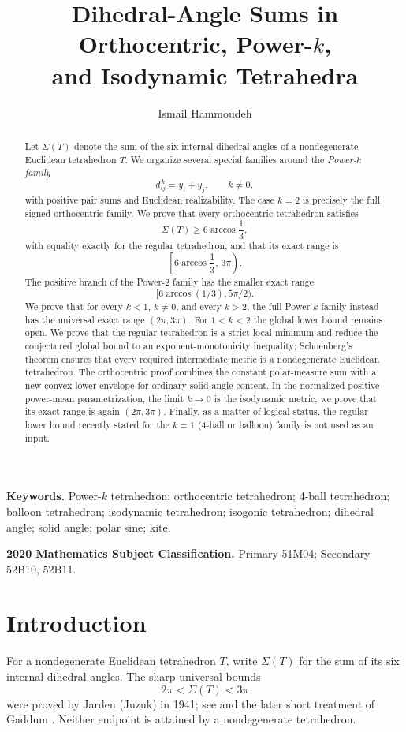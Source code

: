 \documentclass[11pt,a4paper]{article}
\title{Dihedral-Angle Sums in Orthocentric, Power-$k$,\\
and Isodynamic Tetrahedra}
\author{Ismail Hammoudeh}
\date{}
\theoremstyle{definition}
\theoremstyle{remark}
\begin{document}
\maketitle

\begin{abstract}
Let $\Sigma(T)$ denote the sum of the six internal dihedral angles of a
nondegenerate Euclidean tetrahedron $T$.  We organize several special
families around the \emph{Power-$k$ family}
\[
 d_{ij}^{\,k}=y_i+y_j,\qquad k\ne0,
\]
with positive pair sums and Euclidean realizability.  The case $k=2$ is
precisely the full signed orthocentric family.  We prove that every
orthocentric tetrahedron satisfies
\[
  \Sigma(T)\geq 6\arccos\frac13,
\]
with equality exactly for the regular tetrahedron, and that its exact range
is
\[
 \left[6\arccos\frac13,\,3\pi\right).
\]
The positive branch of the Power-$2$ family has the smaller exact range
\[
 [6\arccos(1/3),5\pi/2).
\]
We prove that for every $k<1$, $k\ne0$, and every $k>2$, the full Power-$k$
family instead has the universal exact range $(2\pi,3\pi)$.  For
$1<k<2$ the global lower bound remains open.  We prove that the regular
tetrahedron is a strict local minimum and reduce the conjectured global
bound to an exponent-monotonicity inequality; Schoenberg's theorem ensures
that every required intermediate metric is a nondegenerate Euclidean
tetrahedron.
The orthocentric proof combines the constant polar-measure sum with a new
convex lower envelope for ordinary solid-angle content.  In the normalized
positive power-mean parametrization, the limit $k\to0$ is the isodynamic
metric; we prove that its exact range is again $(2\pi,3\pi)$.  Finally, as a
matter of logical status, the regular lower bound recently stated for the
$k=1$ (4-ball or balloon) family is not used as an input.
\end{abstract}

\noindent\textbf{Keywords.}
Power-$k$ tetrahedron; orthocentric tetrahedron; 4-ball tetrahedron; balloon
tetrahedron; isodynamic tetrahedron; isogonic tetrahedron; dihedral angle;
solid angle; polar sine; kite.

\noindent\textbf{2020 Mathematics Subject Classification.}
Primary 51M04; Secondary 52B10, 52B11.

\section{Introduction}

For a nondegenerate Euclidean tetrahedron $T$, write $\Sigma(T)$ for the sum
of its six internal dihedral angles.  The sharp universal bounds
\begin{equation}\label{eq:gaddum}
  2\pi<\Sigma(T)<3\pi
\end{equation}
were proved by Jarden (Juzuk) in 1941; see \cite{Jarden1941} and the later
short treatment of Gaddum \cite{Gaddum1952}.  Neither endpoint is attained by
a nondegenerate tetrahedron.
\end{document}
